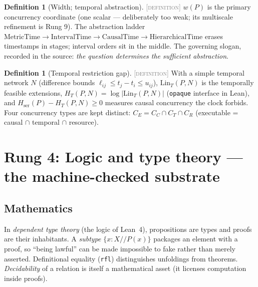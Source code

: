 \documentclass[11pt]{article}
\newcommand{\DEFINITION}{\textcolor{gray}{\textsc{[definition]}}}
\newcommand{\Lin}{\mathrm{Lin}}
\newcommand{\Hser}{H_{\mathrm{ser}}}
\theoremstyle{plain}
\theoremstyle{definition}
\newtheorem{definition}[theorem]{Definition}
\theoremstyle{remark}
\begin{document}
\begin{definition}[Width; temporal abstraction]\DEFINITION\;
$w(P)$ is the primary concurrency coordinate (one scalar --- deliberately
too weak; its multiscale refinement is Rung 9). The abstraction ladder
$\mathrm{MetricTime} \to \mathrm{IntervalTime} \to \mathrm{CausalTime} \to
\mathrm{HierarchicalTime}$ erases timestamps in stages; interval orders
sit in the middle. The governing slogan, recorded in the source:
\emph{the question determines the sufficient abstraction}.
\end{definition}

\begin{definition}[Temporal restriction gap]\DEFINITION\;
With a simple temporal network $N$ (difference bounds
$\ell_{ij} \le t_j - t_i \le u_{ij}$), $\Lin_T(P,N)$ is the temporally
feasible extensions, $H_T(P,N) = \log|\Lin_T(P,N)|$
(\texttt{opaque} interface in Lean), and
$\Hser(P) - H_T(P,N) \ge 0$ measures causal concurrency the clock forbids.
Four concurrency types are kept distinct:
$C_E = C_C \cap C_T \cap C_R$ (executable = causal $\cap$ temporal
$\cap$ resource).
\end{definition}

\section{Rung 4: Logic and type theory --- the machine-checked substrate}
\label{sec:rung4}

\subsection{Mathematics}
In \emph{dependent type theory} (the logic of Lean~4), propositions are
types and proofs are their inhabitants. A \emph{subtype}
$\{x : X \mathrel{/\!/} P(x)\}$ packages an element with a proof, so
``being lawful'' can be made impossible to fake rather than merely
asserted. Definitional equality (\texttt{rfl}) distinguishes unfoldings
from theorems. \emph{Decidability} of a relation is itself a mathematical
asset (it licenses computation inside proofs).
\end{document}
